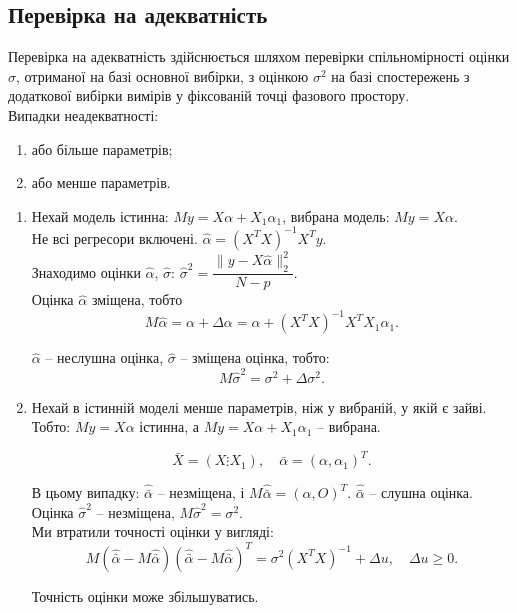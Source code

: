 \subsection{Перевірка на адекватність}

Перевірка на адекватність здійснюється шляхом перевірки спільномірності оцінки $\widehat{\sigma}$, отриманої на базі основної вибірки, з оцінкою $\sigma^2$ на базі спостережень з додаткової вибірки вимірів у фіксованій точці фазового простору. \\

Випадки неадекватності:
\begin{enumerate}
	\item або більше параметрів;
	\item або менше параметрів.
\end{enumerate}

\begin{enumerate}
	\item Нехай модель істинна: $My = X\alpha+X_1\alpha_1$, вибрана модель: $My = X\alpha$. \\

	Не всі регресори включені. $\widehat{\alpha} = (X^TX)^{-1}X^Ty$. \\

	Знаходимо оцінки $\widehat{\alpha}$, $\widehat{\sigma}$: $\widehat{\sigma}^2 = \dfrac{\|y-X\widehat{\alpha}\|_2^2}{N-p}$. \\

	Оцінка $\widehat{\alpha}$ зміщена, тобто \[ M \widehat{\alpha} = \alpha + \Delta \alpha = \alpha + (X^TX)^{-1}X^TX_1\alpha_1. \]

	$\widehat{\alpha}$ -- неслушна оцінка, $\widehat{\sigma}$ -- зміщена оцінка, тобто: \[ M\widehat{\sigma}^2 = \sigma^2 + \Delta\sigma^2.\]

	\item Нехай в істинній моделі менше параметрів, ніж у вибраній, у якій є зайві. Тобто: $My = X\alpha$ істинна, а $My = X\alpha + X_1\alpha_1$ -- вибрана.

	\[ \bar{X} = (X\vdots X_1), \quad \bar{\alpha} = (\alpha, \alpha_1)^T. \]

	В цьому випадку: $\widehat{\bar{\alpha}}$ -- незміщена, і $M\widehat{\bar{\alpha}}=(\alpha,O)^T$. $\widehat{\bar{\alpha}}$ -- слушна оцінка. \\

	Оцінка $\widehat{\sigma}^2$ -- незміщена, $M\widehat{\sigma}^2 = \sigma^2$. \\

	Ми втратили точності оцінки у вигляді: \[ M(\widehat{\bar{\alpha}}-M\widehat{\bar{\alpha}})(\widehat{\bar{\alpha}}-M\widehat{\bar{\alpha}})^T =\sigma^2 (X^TX)^{-1} + \Delta u, \quad \Delta u \ge 0. \]
 
  	Точність оцінки може збільшуватись.
\end{enumerate}
